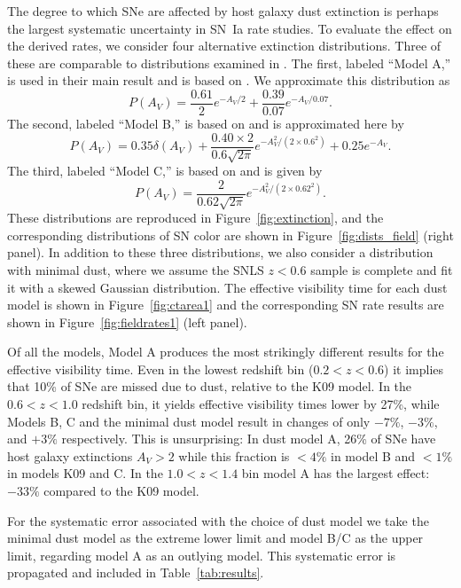 The degree to which SNe are affected by host galaxy dust extinction is
perhaps the largest systematic uncertainty in SN~Ia rate studies. To
evaluate the effect on the derived rates, we consider four alternative
extinction distributions. Three of these are comparable to
distributions examined in \citet{dahlen08a}. The first, labeled
``Model A,'' is used in their main result and is based
on \citet{hatano98a}. We approximate this distribution as
\begin{equation}
P(A_V) = \frac{0.61}{2}e^{-A_V/2} + \frac{0.39}{0.07}e^{-A_V/0.07}.
\end{equation}
The second, labeled ``Model B,'' is based
on \citet{riello05a} and is approximated here by
\begin{equation}
P(A_V) = 0.35 \delta(A_V) + 
\frac{0.40 \times 2}{0.6 \sqrt{2\pi}}e^{-A_V^2/(2 \times 0.6^2)} + 0.25 e^{-A_V}.
\end{equation}
The third, labeled ``Model C,'' is based on \citet{neill06a} and is given by
\begin{equation}
P(A_V) = \frac{2}{0.62 \sqrt{2\pi}}e^{-A_V^2/(2 \times 0.62^2)}.
\end{equation}
These distributions are reproduced in Figure~\ref{fig:extinction}, and
the corresponding distributions of SN color are shown in
Figure~\ref{fig:dists_field} (right panel).  In addition to these three
distributions, we also consider a distribution with minimal dust,
where we assume the SNLS $z<0.6$ sample is complete and fit it
with a skewed Gaussian distribution.  The effective visibility time
for each dust model is shown in Figure~\ref{fig:ctarea1} and the
corresponding SN rate results are shown in
Figure~\ref{fig:fieldrates1} (left panel).

Of all the models, Model A produces the most strikingly different
results for the effective visibility time. Even in the lowest redshift
bin ($0.2<z<0.6$) it implies that 10\% of SNe are missed due to dust,
relative to the K09 model. In the $0.6<z<1.0$ redshift bin, it yields
effective visibility times lower by 27\%, while Models B, C and the
minimal dust model result in changes of only $-7\%$, $-3\%$, and
$+3\%$ respectively. This is unsurprising: In dust model A, 26\% of
SNe have host galaxy extinctions $A_V > 2$ while this fraction is
$<4\%$ in model B and $<1\%$ in models K09 and C. In the $1.0 < z <
1.4$ bin model A has the largest effect: $-33\%$ compared to the K09
model.

For the systematic error associated with the choice of dust model we
take the minimal dust model as the extreme lower limit and model B/C
as the upper limit, regarding model A as an outlying model. This
systematic error is propagated and included in
Table~\ref{tab:results}.

